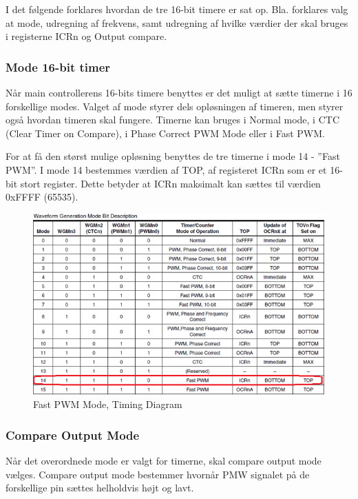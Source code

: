 \newpage

I det følgende forklares hvordan de tre 16-bit timere er sat op. Bla. forklares valg at mode, udregning af frekvens, samt udregning af hvilke værdier der skal bruges i registerne ICRn og Output compare.

\subsubsection*{Mode 16-bit timer}

Når main controllerens 16-bits timere benyttes er det muligt at sætte timerne i 16 forskellige modes. Valget af mode styrer dels opløsningen af timeren, men styrer også hvordan timeren skal fungere. Timerne kan bruges i Normal mode, i CTC (Clear Timer on Compare), i Phase Correct PWM Mode eller i Fast PWM.

For at få den størst mulige opløsning benyttes de tre timerne i mode 14 - ”Fast PWM”. I mode 14 bestemmes værdien af TOP, af registeret ICRn som er et 16-bit stort register. Dette betyder at ICRn maksimalt kan sættes til værdien 0xFFFF (65535). 

\begin{figure}[H]
	\centering
	\includegraphics[width=1.\textwidth]{Billeder/Timer/1_mode.png}
	\caption{Fast PWM Mode, Timing Diagram}
	\label{fig:Timing_diagram}
\end{figure}

\newpage

\subsubsection*{Compare Output Mode}
Når det overordnede mode er valgt for timerne, skal compare output mode vælges. Compare output mode bestemmer hvornår PMW signalet på de forskellige pin sættes helholdvis højt og lavt.

